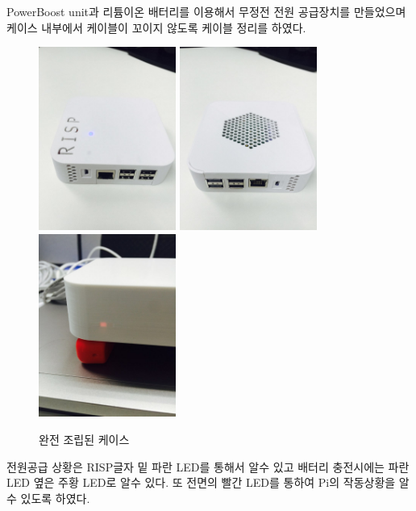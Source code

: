 \documentclass[11pt
  , a4paper
  , article
  , oneside
]{memoir}
\begin{document}
PowerBoost unit과 리튬이온 배터리를 이용해서 무정전 전원 공급장치를 만들었으며 케이스 내부에서 케이블이 꼬이지 않도록 케이블 정리를 하였다.
\clearpage
\begin{center}
	\begin{figure}[h]
		\includegraphics[width=4.5cm]{./images/d.jpg}
		\includegraphics[width=4.5cm]{./images/e.jpg}
		\includegraphics[width=4.5cm]{./images/g.jpg}
		\caption{완전 조립된 케이스}
	\end{figure}
\end{center}
전원공급 상황은 RISP글자 밑 파란 LED를 통해서 알수 있고 배터리 충전시에는 파란 LED 옆은 주황 LED로 알수 있다. 또 전면의 빨간 LED를 통하여 Pi의 작동상황을 알수 있도록 하였다.
\end{document}
